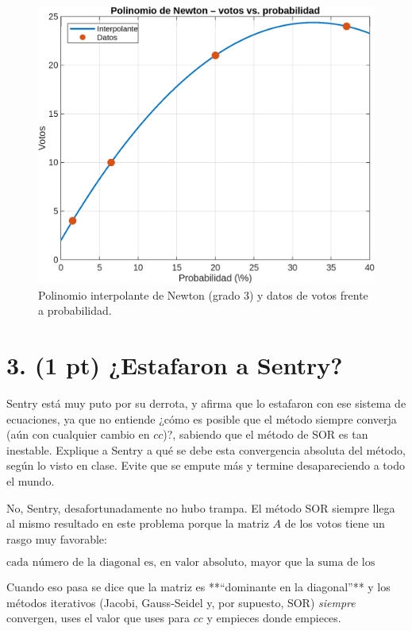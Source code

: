 \begin{figure}[h]
    \includegraphics[width=.75\textwidth]{Figures/0. General/PolinomioNewton.png}
    \caption{Polinomio interpolante de Newton (grado 3) y datos de votos
             frente a probabilidad.}
    \label{fig:poly_newton}
\end{figure}

\hfill\break

\section{3. (1 pt) ¿Estafaron a Sentry?}

Sentry está muy puto por su derrota, y afirma que lo estafaron con ese sistema
de ecuaciones, ya que no entiende ¿cómo es posible que el método siempre
converja (aún con cualquier cambio en $cc$)?, sabiendo que el método de SOR es tan
inestable. Explique a Sentry a qué se debe esta convergencia absoluta del
método, según lo visto en clase. Evite que se empute más y termine
desapareciendo a todo el mundo.\\

\hfill\break

No, Sentry, desafortunadamente no hubo trampa.  
El método SOR siempre llega al mismo resultado en este problema porque la
matriz \(A\) de los votos tiene un rasgo muy favorable:

\[
\text{cada número de la diagonal es, en valor absoluto, mayor que la suma de
los demás números de su fila.}
\]

Cuando eso pasa se dice que la matriz es **“dominante en la diagonal”** y los
métodos iterativos (Jacobi, Gauss-Seidel y, por supuesto, SOR) \emph{siempre}
convergen, uses el valor que uses para \(cc\) y empieces donde empieces.

